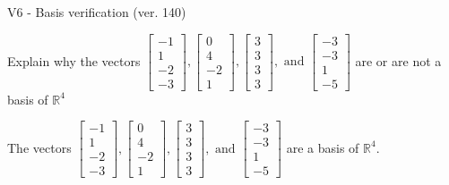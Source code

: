 \begin{exercise}
  \begin{exerciseTitle}V6 - Basis verification (ver. 140)\end{exerciseTitle}
  \begin{exerciseStatement}
    Explain why the vectors \(\left[\begin{array}{r}
-1 \\
1 \\
-2 \\
-3
\end{array}\right] , \left[\begin{array}{r}
0 \\
4 \\
-2 \\
1
\end{array}\right] , \left[\begin{array}{r}
3 \\
3 \\
3 \\
3
\end{array}\right] , \text{ and } \left[\begin{array}{r}
-3 \\
-3 \\
1 \\
-5
\end{array}\right]\) are or are not a basis of \(\mathbb{R}^4\)	


  \end{exerciseStatement}
  \begin{exerciseAnswer}
   The vectors \(\left[\begin{array}{r}
-1 \\
1 \\
-2 \\
-3
\end{array}\right] , \left[\begin{array}{r}
0 \\
4 \\
-2 \\
1
\end{array}\right] , \left[\begin{array}{r}
3 \\
3 \\
3 \\
3
\end{array}\right] , \text{ and } \left[\begin{array}{r}
-3 \\
-3 \\
1 \\
-5
\end{array}\right]\) 
  	 are  a basis of \(\mathbb{R}^4\).
  


  \end{exerciseAnswer}
\end{exercise}
